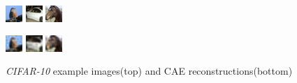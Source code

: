 \documentclass[draft]{article}
\begin{document}
    \begin{figure}[h]
      \centering
      \includegraphics[width=0.15\linewidth]{../graphics/reconstructions/cifar/input_00.png}
      \includegraphics[width=0.15\linewidth]{../graphics/reconstructions/cifar/input_01.png}
      \includegraphics[width=0.15\linewidth]{../graphics/reconstructions/cifar/input_02.png}

      \includegraphics[width=0.15\linewidth]{../graphics/reconstructions/cifar/reconstruction_00.png}
      \includegraphics[width=0.15\linewidth]{../graphics/reconstructions/cifar/reconstruction_01.png}
      \includegraphics[width=0.15\linewidth]{../graphics/reconstructions/cifar/reconstruction_02.png}

      \caption{\emph{CIFAR-10} example images(top) and CAE reconstructions(bottom)}
      \label{fig:cifar_reconstructions}

    \end{figure}
\end{document}
